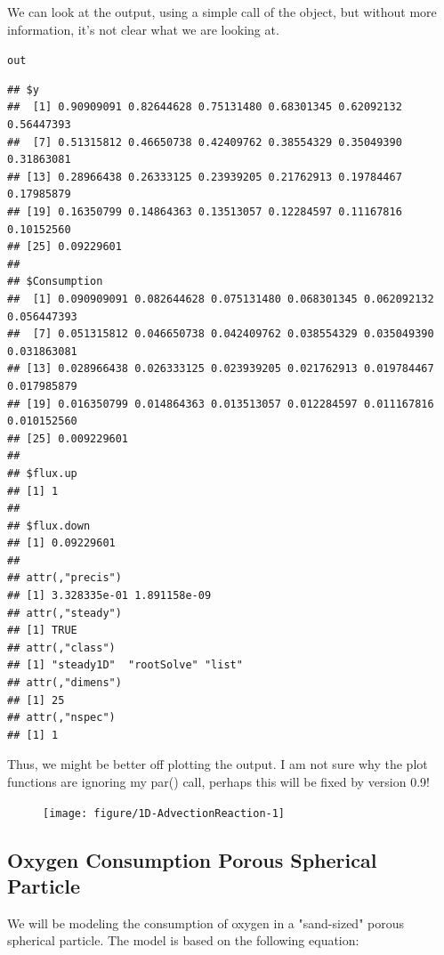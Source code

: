\documentclass{tufte-handout}\usepackage[]{graphicx}\usepackage[]{xcolor}
\makeatletter
\newcommand{\hlstd}[1]{\textcolor[rgb]{0.345,0.345,0.345}{#1}}%
\newenvironment{kframe}{%
 \def\at@end@of@kframe{}%
 \ifinner\ifhmode%
  \def\at@end@of@kframe{\end{minipage}}%
  \begin{minipage}{\columnwidth}%
 \fi\fi%
 \def\FrameCommand##1{\hskip\@totalleftmargin \hskip-\fboxsep
 \colorbox{shadecolor}{##1}\hskip-\fboxsep
     \hskip-\linewidth \hskip-\@totalleftmargin \hskip\columnwidth}%
 \MakeFramed {\advance\hsize-\width
   \@totalleftmargin\z@ \linewidth\hsize
   \@setminipage}}%
 {\par\unskip\endMakeFramed%
 \at@end@of@kframe}
\newenvironment{knitrout}{}{} %
\makeatother
\begin{document}
We can look at the output, using a simple call of the object, but without more information, it's not clear what we are looking at. 
\begin{knitrout}
\color{fgcolor}\begin{kframe}
\begin{alltt}
\hlstd{out}
\end{alltt}
\begin{verbatim}
## $y
##  [1] 0.90909091 0.82644628 0.75131480 0.68301345 0.62092132 0.56447393
##  [7] 0.51315812 0.46650738 0.42409762 0.38554329 0.35049390 0.31863081
## [13] 0.28966438 0.26333125 0.23939205 0.21762913 0.19784467 0.17985879
## [19] 0.16350799 0.14864363 0.13513057 0.12284597 0.11167816 0.10152560
## [25] 0.09229601
## 
## $Consumption
##  [1] 0.090909091 0.082644628 0.075131480 0.068301345 0.062092132 0.056447393
##  [7] 0.051315812 0.046650738 0.042409762 0.038554329 0.035049390 0.031863081
## [13] 0.028966438 0.026333125 0.023939205 0.021762913 0.019784467 0.017985879
## [19] 0.016350799 0.014864363 0.013513057 0.012284597 0.011167816 0.010152560
## [25] 0.009229601
## 
## $flux.up
## [1] 1
## 
## $flux.down
## [1] 0.09229601
## 
## attr(,"precis")
## [1] 3.328335e-01 1.891158e-09
## attr(,"steady")
## [1] TRUE
## attr(,"class")
## [1] "steady1D"  "rootSolve" "list"     
## attr(,"dimens")
## [1] 25
## attr(,"nspec")
## [1] 1
\end{verbatim}
\end{kframe}
\end{knitrout}

Thus, we might be better off plotting the output. I am not sure why the plot functions are ignoring my par() call, perhaps this will be fixed by version 0.9!

\begin{figure}
\begin{knitrout}
\color{fgcolor}
\texttt{[image: figure/1D-AdvectionReaction-1]} 
\end{knitrout}
\end{figure}

\subsection{Oxygen Consumption Porous Spherical Particle}

We will be modeling the consumption of oxygen in a "sand-sized" porous spherical particle. The model is based on the following equation:
\end{document}
